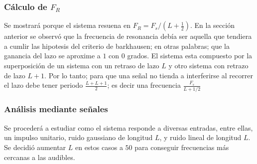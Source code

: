 \documentclass[assd_tp2_main.tex]{subfiles}
\begin{document}
\subsubsection{Cálculo de $F_R$}
Se mostrará porque el sistema resuena en $F_R=F_s/(L+\frac{1}{2})$. En la sección anterior se observó que la frecuencia de resonancia debía ser aquella que tendiera a cumlir las hipotesis del criterio de barkhausen; en otras palabras; que la ganancia del lazo se aproxime a $1$ con $0$ grados. 
El sistema esta compuesto por la superposición de un sistema con un retraso de lazo $L$ y otro sistema con retrazo de lazo $L+1$. Por lo tanto; para que una señal no tienda a interferirse al recorrer el lazo debe tener periodo $\frac{L+L+1}{2}$; es decir una frecuencia $\frac{F_s}{L+1/2}$

\subsubsection{Análisis mediante señales}
 
Se procederá a estudiar como el sistema responde a diversas entradas, entre ellas, un impulso unitario, ruido gaussiano de longitud $L$, y ruido lineal de longitud $L$. Se decidió aumentar $L$ en estos casos a $50$ para conseguir frecuencias más cercanas a las audibles.
 
\end{document}
